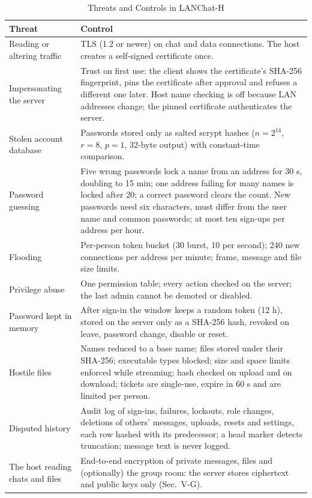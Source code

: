 \documentclass[conference]{IEEEtran}
\begin{document}
\begin{table}[t]
\centering
\caption{Threats and Controls in LANChat-H}
\label{tab:security}
\footnotesize
\begin{tabularx}{\textwidth}{@{}>{\raggedright\arraybackslash}p{3.6cm} Y@{}}
\toprule
\textbf{Threat} & \textbf{Control} \\
\midrule
Reading or altering traffic & TLS (1.2 or newer) on chat and data connections. The host creates a self-signed certificate once. \\
Impersonating the server & Trust on first use: the client shows the certificate's SHA-256 fingerprint, pins the certificate after approval and refuses a different one later. Host name checking is off because LAN addresses change; the pinned certificate authenticates the server. \\
Stolen account database & Passwords stored only as salted scrypt hashes ($n=2^{14}$, $r=8$, $p=1$, 32-byte output) with constant-time comparison. \\
Password guessing & Five wrong passwords lock a name from an address for 30 s, doubling to 15 min; one address failing for many names is locked after 20; a correct password clears the count. New passwords need six characters, must differ from the user name and common passwords; at most ten sign-ups per address per hour. \\
Flooding & Per-person token bucket (30 burst, 10 per second); 240 new connections per address per minute; frame, message and file size limits. \\
Privilege abuse & One permission table; every action checked on the server; the last admin cannot be demoted or disabled. \\
Password kept in memory & After sign-in the window keeps a random token (12 h), stored on the server only as a SHA-256 hash, revoked on leave, password change, disable or reset. \\
Hostile files & Names reduced to a base name; files stored under their SHA-256; executable types blocked; size and space limits enforced while streaming; hash checked on upload and on download; tickets are single-use, expire in 60 s and are limited per person. \\
Disputed history & Audit log of sign-ins, failures, lockouts, role changes, deletions of others' messages, uploads, resets and settings, each row hashed with its predecessor; a head marker detects truncation; message text is never logged. \\
The host reading chats and files & End-to-end encryption of private messages, files and (optionally) the group room: the server stores ciphertext and public keys only (Sec.~V-G). \\

\end{tabularx}
\end{table}
\end{document}
